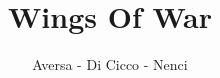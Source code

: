 \documentclass[12pt]{report}
\title{Wings Of War}
\author{Aversa - Di Cicco - Nenci}
\begin{document}
\maketitle
\tableofcontents

\label{Introduction}


\label{Rules}


\label{Heuristics}


\label{AI}


\label{Results}

\end{document}
